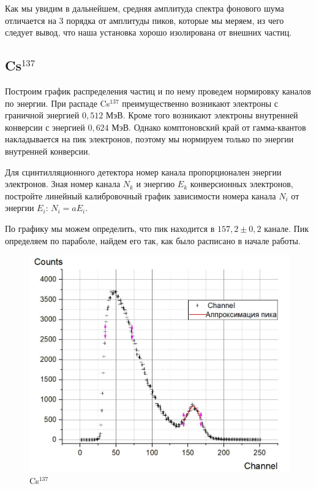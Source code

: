 \documentclass[a4paper, 12pt]{article}%
\begin{document}
Как мы увидим в дальнейшем, средняя амплитуда спектра фонового шума отличается на 3 порядка от амплитуды пиков, которые мы меряем, из чего следует вывод, что наша установка хорошо изолирована от внешних частиц.
\newpage
\subsection*{Cs$^{137}$}
Построим график распределения частиц и по нему проведем нормировку каналов по энергии. При распаде Cs$^137$ преимущественно возникают электроны с граничной энергией $0,512$ МэВ. Кроме того возникают электроны внутренней конверсии с энергией $0,624$ МэВ. Однако комптоновский край от гамма-квантов накладывается на пик электронов, поэтому мы нормируем только по энергии внутренней конверсии.

Для сцинтилляционного детектора номер канала пропорционален энергии электронов. Зная номер канала $N_k$ и энергию $E_k$ конверсионных электронов, постройте линейный калибровочный график зависимости номера канала $N_i$ от энергии $E_i$: $N_i = a E_i$. 

По графику мы можем определить, что пик находится в $157,2 \pm 0,2$ канале. Пик определяем по параболе, найдем его так, как было расписано в начале работы.

\begin{figure}[h]
\begin{center}
\includegraphics[width = \textwidth]{8.jpg}
\caption{Cs$^{137}$}
\end{center}
\end{figure}
\end{document}
